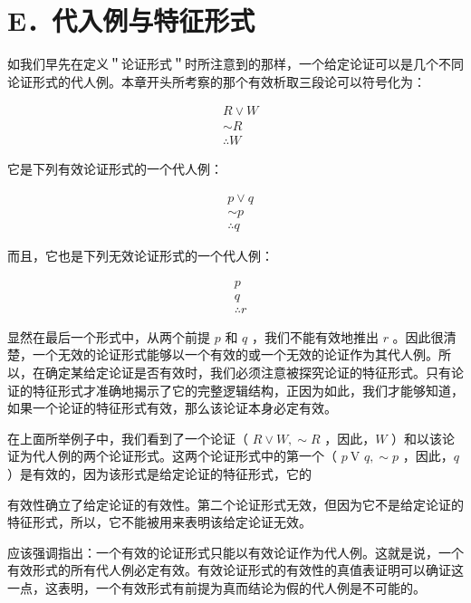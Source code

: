 \section*{E．代入例与特征形式}
如我们早先在定义＂论证形式＂时所注意到的那样，一个给定论证可以是几个不同论证形式的代人例。本章开头所考察的那个有效析取三段论可以符号化为：

$$
\begin{aligned}
& R \vee W \\
& \sim R \\
& \therefore W
\end{aligned}
$$

它是下列有效论证形式的一个代人例：

$$
\begin{aligned}
& p \vee q \\
& \sim p \\
& \therefore q
\end{aligned}
$$

而且，它也是下列无效论证形式的一个代人例：

$$
\begin{aligned}
& p \\
& q \\
& \therefore r
\end{aligned}
$$

显然在最后一个形式中，从两个前提 $p$ 和 $q$ ，我们不能有效地推出 $r$ 。因此很清楚，一个无效的论证形式能够以一个有效的或一个无效的论证作为其代人例。所以，在确定某给定论证是否有效时，我们必须注意被探究论证的特征形式。只有论证的特征形式才准确地揭示了它的完整逻辑结构，正因为如此，我们才能够知道，如果一个论证的特征形式有效，那么该论证本身必定有效。

在上面所举例子中，我们看到了一个论证（ $R \vee W, \sim R$ ，因此，$W$ ）和以该论证为代人例的两个论证形式。这两个论证形式中的第一个（ $p \mathrm{~V}$ $q, \sim p$ ，因此，$q$ ）是有效的，因为该形式是给定论证的特征形式，它的

有效性确立了给定论证的有效性。第二个论证形式无效，但因为它不是给定论证的特征形式，所以，它不能被用来表明该给定论证无效。

应该强调指出：一个有效的论证形式只能以有效论证作为代人例。这就是说，一个有效形式的所有代人例必定有效。有效论证形式的有效性的真值表证明可以确证这一点，这表明，一个有效形式有前提为真而结论为假的代人例是不可能的。

